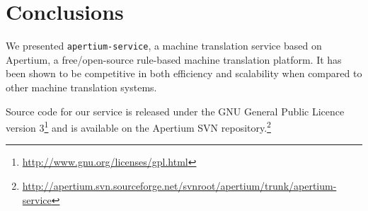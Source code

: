 \documentclass[11pt]{article}
\begin{document}
\section{Conclusions}

We presented {\tt\small apertium-service}, a machine translation service based on 
Apertium, a free/open-source rule-based machine translation platform. It has been 
shown to be competitive in both efficiency and scalability when compared to other 
machine translation systems.

Source code for our service is released under the GNU General Public Licence 
version 3\footnote{\small\url{http://www.gnu.org/licenses/gpl.html}} and is available 
on the Apertium SVN repository.\footnote{{\small\url{http://apertium.svn.sourceforge.net/svnroot/apertium/trunk/apertium-service}}}
\end{document}
